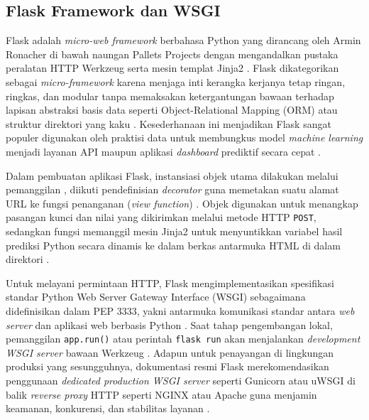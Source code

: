 \documentclass[a4paper,oneside,11pt]{book}
\begin{document}
\subsection{Flask Framework dan WSGI}
\par Flask adalah \textit{micro-web framework} berbahasa Python yang dirancang oleh Armin Ronacher di bawah naungan Pallets Projects dengan mengandalkan pustaka peralatan HTTP Werkzeug serta mesin templat Jinja2 \cite{grinberg2018flask, flask_quickstart}. Flask dikategorikan sebagai \textit{micro-framework} karena menjaga inti kerangka kerjanya tetap ringan, ringkas, dan modular tanpa memaksakan ketergantungan bawaan terhadap lapisan abstraksi basis data seperti Object-Relational Mapping (ORM) atau struktur direktori yang kaku \cite{grinberg2018flask}. Kesederhanaan ini menjadikan Flask sangat populer digunakan oleh praktisi data untuk membungkus model \textit{machine learning} menjadi layanan API maupun aplikasi \textit{dashboard} prediktif secara cepat \cite{huyen2022designing, flask_quickstart}.
\par Dalam pembuatan aplikasi Flask, instansiasi objek utama dilakukan melalui pemanggilan , diikuti pendefinisian \textit{decorator}  guna memetakan suatu alamat URL ke fungsi penanganan (\textit{view function}) \cite{flask_quickstart}. Objek  digunakan untuk menangkap pasangan kunci dan nilai yang dikirimkan melalui metode HTTP \texttt{POST}, sedangkan fungsi  memanggil mesin Jinja2 untuk menyuntikkan variabel hasil prediksi Python secara dinamis ke dalam berkas antarmuka HTML di dalam direktori  \cite{grinberg2018flask}.
\par Untuk melayani permintaan HTTP, Flask mengimplementasikan spesifikasi standar Python Web Server Gateway Interface (WSGI) sebagaimana didefinisikan dalam PEP 3333, yakni antarmuka komunikasi standar antara \textit{web server} dan aplikasi web berbasis Python \cite{pep3333_wsgi}. Saat tahap pengembangan lokal, pemanggilan \texttt{app.run()} atau perintah \texttt{flask run} akan menjalankan \textit{development WSGI server} bawaan Werkzeug \cite{flask_quickstart}. Adapun untuk penayangan di lingkungan produksi yang sesungguhnya, dokumentasi resmi Flask merekomendasikan penggunaan \textit{dedicated production WSGI server} seperti Gunicorn atau uWSGI di balik \textit{reverse proxy} HTTP seperti NGINX atau Apache guna menjamin keamanan, konkurensi, dan stabilitas layanan \cite{flask_deploying, grinberg2018flask}.
\end{document}
